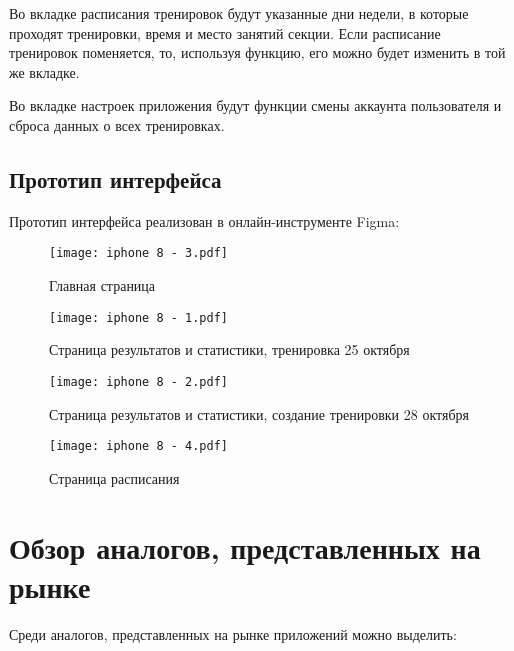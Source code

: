 \documentclass[14pt]{extreport}
\begin{document}
Во вкладке расписания тренировок будут указанные дни недели, в которые проходят тренировки, время и место занятий секции. Если расписание тренировок поменяется, то, используя функцию, его можно будет изменить в той же вкладке.

Во вкладке настроек приложения будут функции смены аккаунта пользователя и сброса данных о всех тренировках.

\subsection{Прототип интерфейса}

Прототип интерфейса реализован в онлайн-инструменте Figma:

\begin{figure}[H]
\centerline{\texttt{[image: iphone 8 - 3.pdf]}}
\caption{Главная страница}
\label{fig11}
\end{figure}

\begin{figure}[H]
\centerline{\texttt{[image: iphone 8 - 1.pdf]}}
\caption{Страница результатов и статистики, тренировка 25 октября}
\label{fig12}
\end{figure}

\begin{figure}[H]
\centerline{\texttt{[image: iphone 8 - 2.pdf]}}
\caption{Страница результатов и статистики, создание тренировки 28 октября}
\label{fig13}
\end{figure}

\begin{figure}[H]
\centerline{\texttt{[image: iphone 8 - 4.pdf]}}
\caption{Страница расписания}
\label{fig14}
\end{figure}


\section{Обзор аналогов, представленных на рынке}

Среди аналогов, представленных на рынке приложений можно выделить:
\end{document}
